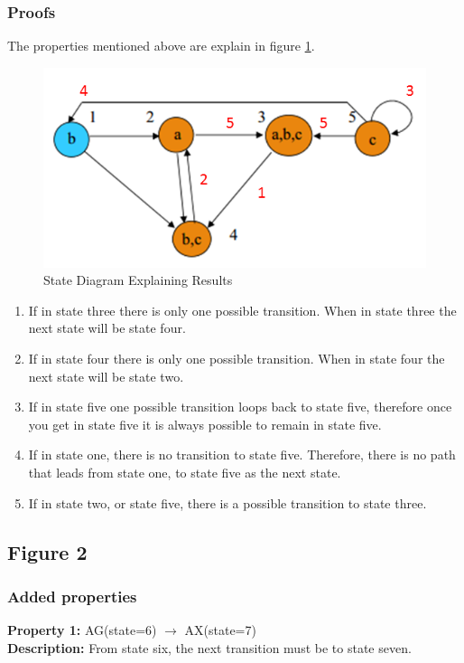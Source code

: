 \documentclass[11pt]{article}
\begin{document}
	\subsubsection{Proofs}
	The properties mentioned above are explain in figure \ref{p2_1_p}.
	\begin{figure}[h]\centering
	\includegraphics[height=0.45\textwidth]{images/p2_1_proof.png}
		\caption{State Diagram Explaining Results}
			\label{p2_1_p}
		\end{figure}
\begin{enumerate}
\item If in state three there is only one possible transition. When in state three the next state will be state four.
\item  If in state four there is only one possible transition. When in state four the next state will be state two.
\item  If in state five one possible transition loops back to state five, therefore once you get in state five it is always possible to remain in state five.
\item  If in state one, there is no transition to state five. Therefore, there is no path that leads from state one, to state five as the next state.
\item  If in state two, or state five, there is a possible transition to state three.
\end{enumerate}	

	
\subsection{Figure 2}
	\subsubsection{Added properties}
	
		\textbf{Property 1:} 	AG(state=6) $\to$ AX(state=7) 	\\	
		\textbf{Description:} From state six, the next transition must be to state seven. \\
		\vspace{12pt}
		
\end{document}
